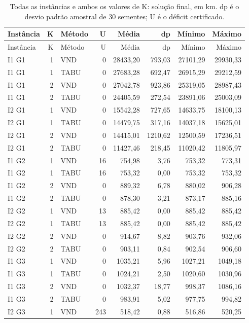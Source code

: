 \begin{longtable}{lrlrrrrr}
\caption{Todas as instâncias e ambos os valores de K: solução final, em km. dp é o desvio padrão amostral de 30 sementes; U é o déficit certificado.}\\
\toprule Instância & K & Método & U & Média & dp & Mínimo & Máximo\\\midrule\endfirsthead
\toprule Instância & K & Método & U & Média & dp & Mínimo & Máximo\\\midrule\endhead
I1 G1 & 1 & VND & 0 & 28433,20 & 793,03 & 27101,29 & 29930,33 \\
I1 G1 & 1 & TABU & 0 & 27683,28 & 692,47 & 26915,29 & 29212,59 \\
I1 G1 & 2 & VND & 0 & 27042,78 & 923,86 & 25319,05 & 28987,43 \\
I1 G1 & 2 & TABU & 0 & 24405,59 & 272,54 & 23891,06 & 25003,09 \\
I2 G1 & 1 & VND & 0 & 15542,28 & 727,65 & 14633,75 & 18100,13 \\
I2 G1 & 1 & TABU & 0 & 14479,75 & 317,16 & 14037,18 & 15625,01 \\
I2 G1 & 2 & VND & 0 & 14415,01 & 1210,62 & 12500,59 & 17236,51 \\
I2 G1 & 2 & TABU & 0 & 11427,46 & 218,45 & 11020,42 & 11805,97 \\
I1 G2 & 1 & VND & 16 & 754,98 & 3,76 & 753,32 & 773,31 \\
I1 G2 & 1 & TABU & 16 & 753,32 & 0,00 & 753,32 & 753,32 \\
I1 G2 & 2 & VND & 0 & 889,32 & 6,78 & 880,02 & 906,28 \\
I1 G2 & 2 & TABU & 0 & 878,30 & 3,21 & 873,17 & 885,16 \\
I2 G2 & 1 & VND & 13 & 885,42 & 0,00 & 885,42 & 885,42 \\
I2 G2 & 1 & TABU & 13 & 885,42 & 0,00 & 885,42 & 885,42 \\
I2 G2 & 2 & VND & 0 & 914,67 & 8,82 & 903,76 & 932,06 \\
I2 G2 & 2 & TABU & 0 & 903,11 & 0,84 & 902,54 & 906,60 \\
I1 G3 & 1 & VND & 0 & 1035,21 & 5,96 & 1027,21 & 1049,18 \\
I1 G3 & 1 & TABU & 0 & 1024,21 & 2,50 & 1020,60 & 1030,96 \\
I1 G3 & 2 & VND & 0 & 1032,37 & 18,77 & 998,37 & 1086,16 \\
I1 G3 & 2 & TABU & 0 & 983,91 & 5,02 & 977,75 & 994,82 \\
I2 G3 & 1 & VND & 243 & 518,42 & 0,88 & 516,86 & 520,25 \\

\end{longtable}
